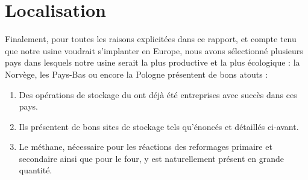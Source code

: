 \documentclass[10pt, a4, oneside, headings=normal]{scrartcl}
\begin{document}
\section{Localisation}
Finalement, pour toutes les raisons explicitées dans ce rapport, et compte tenu que notre usine voudrait s'implanter en Europe, nous avons sélectionné plusieurs pays dans lesquels notre usine serait la plus productive et la plus écologique : la Norvège, les Pays-Bas ou encore la Pologne présentent de bons atouts :
\begin{enumerate}
\item Des opérations de stockage du  ont déjà été entreprises avec succès dans ces pays.
\item Ils présentent de bons sites de stockage tels qu'énoncés et détaillés ci-avant.
\item Le méthane, nécessaire pour les réactions des reformages primaire et secondaire ainsi que pour le four, y est naturellement présent en grande quantité.
\end{enumerate}

\printbibliography[heading=bibintoc]
\end{document}
